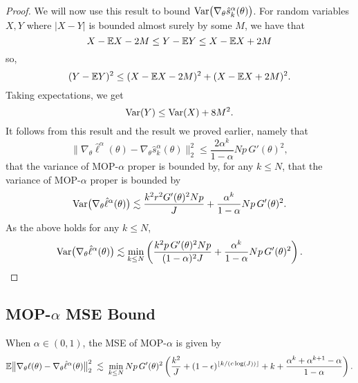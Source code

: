 \begin{proof}
We will now use this result to bound $\mathrm{Var}\big(\nabla_\theta \hat s_k^\alpha(\theta)\big)$. 
For random variables $X,Y$ where $|X-Y|$ is bounded almost surely by some $M$, we have that 
\begin{equation}
X-\mathbb{E} X - 2M \leq Y - \mathbb{E} Y \leq X - \mathbb{E} X + 2M\end{equation}
so,
\begin{equation}
(Y-\mathbb{E} Y)^2 \leq (X-\mathbb{E} X - 2M)^2 + (X-\mathbb{E} X +2M)^2.\end{equation}
Taking expectations, we get
\begin{equation}
\mathrm{Var}(Y) \leq \mathrm{Var}(X) + 8M^2.
\end{equation}
It follows from this result and the result we proved earlier, namely that
\begin{equation}
\big\|\nabla_\theta\hat\ell^\alpha(\theta) - \nabla_\theta \hat s_k^\alpha(\theta)\big\|_2^2 \leq \frac{2\alpha^k}{1-\alpha}Np \, G'(\theta)^2,
\end{equation}
that the variance of MOP-$\alpha$ proper is bounded by, for any $k \leq N$,
that the variance of MOP-$\alpha$ proper is bounded by
\begin{equation}
\mathrm{Var}\big(\nabla_\theta \hat\ell^\alpha(\theta)\big) \lesssim \frac{k^2r^2G'(\theta)^2Np}{J} + \frac{\alpha^{k}}{1-\alpha}Np \, G'(\theta)^2.
\end{equation}
As the above holds for any $k \leq N$,
\begin{equation}
\mathrm{Var}\big(\nabla_\theta \hat\ell^\alpha(\theta)\big) \lesssim \min_{k\leq N} \left(\frac{k^2p \, G'(\theta)^2Np}{(1-\alpha)^2J} + \frac{\alpha^{k}}{1-\alpha}Np \, G'(\theta)^2 \right).\end{equation}
\end{proof}


\subsection{MOP-$\alpha$ MSE Bound}

\begin{thm}
    When $\alpha \in (0,1)$, the MSE of MOP-$\alpha$ is given by
    \begin{equation}
        \mathbb{E}\big\|\nabla_\theta\ell(\theta) - \nabla_\theta \hat\ell^\alpha(\theta)\big\|_2^2 \; \lesssim \; \min_{k \leq N} Np \, G'(\theta)^2\left(\frac{k^2}{J}+(1-\epsilon)^{\lfloor k/(c\log(J)) \rfloor}+k+\frac{\alpha^k  + \alpha^{k+1} - \alpha}{1-\alpha}\right).
    \end{equation}
\end{thm}

